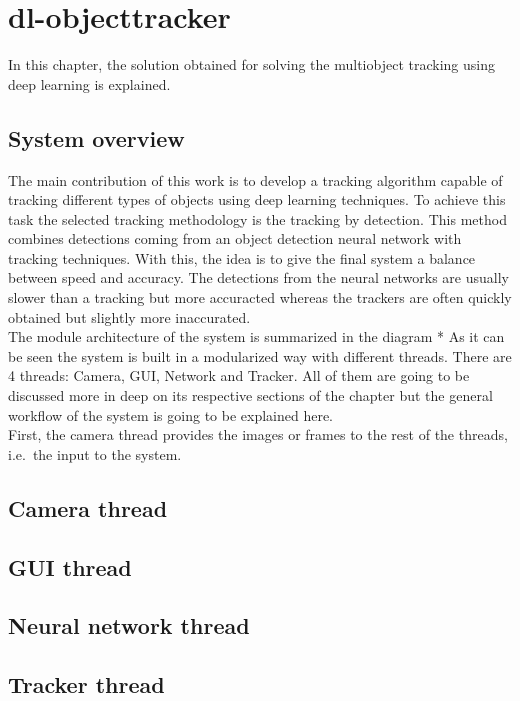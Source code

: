 \chapter{dl-objecttracker}
In this chapter, the solution obtained for solving the multiobject tracking using deep learning is explained.

\section{System overview}
The main contribution of this work is to develop a tracking algorithm capable of tracking different types of objects using deep learning techniques. To achieve this task the selected tracking methodology is the tracking by detection. This method combines detections coming from an object detection neural network with tracking techniques. With this, the idea is to give the final system a balance between speed and accuracy. The detections from the neural networks are usually slower than a tracking but more accuracted whereas the trackers are often quickly obtained but slightly more inaccurated.\\
The module architecture of the system is summarized in the diagram *%
As it can be seen the system is built in a modularized way with different threads. There are 4 threads: Camera, GUI, Network and Tracker. All of them are going to be discussed more in deep on its respective sections of the chapter but the general workflow of the system is going to be explained here.\\
First, the camera thread provides the images or frames to the rest of the threads, i.e.\ the input to the system.
\section{Camera thread}

\section{GUI thread}

\section{Neural network thread}

\section{Tracker thread}
